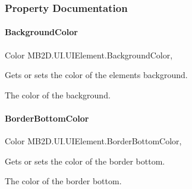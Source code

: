 \subsubsection{Property Documentation}
\hypertarget{class_m_b2_d_1_1_u_i_1_1_u_i_element_abcd3eabd4db0998955a1e856a41d3d84}{}\label{class_m_b2_d_1_1_u_i_1_1_u_i_element_abcd3eabd4db0998955a1e856a41d3d84} 
\paragraph{\texorpdfstring{Background\+Color}{BackgroundColor}}
{\footnotesize\ttfamily Color M\+B2\+D.\+U\+I.\+U\+I\+Element.\+Background\+Color\hspace{0.3cm}{\ttfamily [get]}, {\ttfamily [set]}}



Gets or sets the color of the elements background. 

The color of the background.\hypertarget{class_m_b2_d_1_1_u_i_1_1_u_i_element_af5fa3d6d3757bfe0a8d5ddd03d897c6c}{}\label{class_m_b2_d_1_1_u_i_1_1_u_i_element_af5fa3d6d3757bfe0a8d5ddd03d897c6c} 
\paragraph{\texorpdfstring{Border\+Bottom\+Color}{BorderBottomColor}}
{\footnotesize\ttfamily Color M\+B2\+D.\+U\+I.\+U\+I\+Element.\+Border\+Bottom\+Color\hspace{0.3cm}{\ttfamily [get]}, {\ttfamily [set]}}



Gets or sets the color of the border bottom. 

The color of the border bottom.\hypertarget{class_m_b2_d_1_1_u_i_1_1_u_i_element_a7e243b6b0b62b303751ce9d0425fbf1f}{}\label{class_m_b2_d_1_1_u_i_1_1_u_i_element_a7e243b6b0b62b303751ce9d0425fbf1f} 
